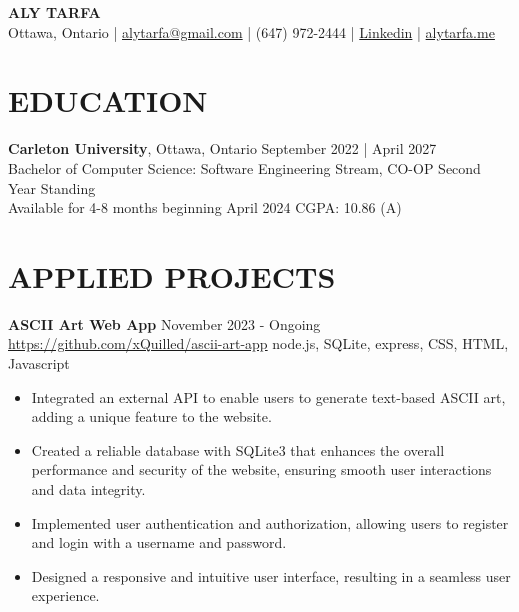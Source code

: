 \documentclass[a4paper,10pt]{extarticle}
\begin{document}
\pagestyle{empty}

\begin{center}
	\textbf{\Large ALY TARFA}\\[2pt]
	Ottawa, Ontario | \href{mailto:alytarfa@gmail.com}{alytarfa@gmail.com} | (647) 972-2444 | \href{https://www.linkedin.com/in/aly-tarfa-b18b59225/}{Linkedin} | \href{https://alytarfa.me/}{alytarfa.me}
\end{center}

\section*{EDUCATION}
\noindent
\textbf{Carleton University}, Ottawa, Ontario \hfill September 2022 | April 2027\\
Bachelor of Computer Science: Software Engineering Stream, CO-OP \hfill Second Year Standing\\
Available for 4-8 months beginning April 2024 \hfill CGPA: 10.86 (A)

\section*{APPLIED PROJECTS}
\noindent
\textbf{ASCII Art Web App} \hfill November 2023 - Ongoing\\
\url{https://github.com/xQuilled/ascii-art-app} \hfill node.js, SQLite, express, CSS, HTML, Javascript
\begin{itemize}
	\item Integrated an external API to enable users to generate text-based ASCII art, adding a unique feature to the website.
	\item Created a reliable database with SQLite3 that enhances the overall performance and security of the website, ensuring smooth user interactions and data integrity.
	\item Implemented user authentication and authorization, allowing users to register and login with a username and password.
	\item Designed a responsive and intuitive user interface, resulting in a seamless user experience.
\end{itemize}
\end{document}
